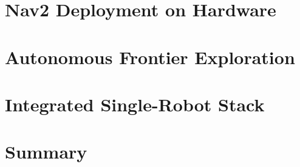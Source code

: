 \section{Nav2 Deployment on Hardware}
\label{sec:nav2_hw}

\section{Autonomous Frontier Exploration}
\label{sec:explore_hw}

\section{Integrated Single-Robot Stack}
\label{sec:integrated_single_robot}

\section{Summary}
\label{sec:hw_summary}
